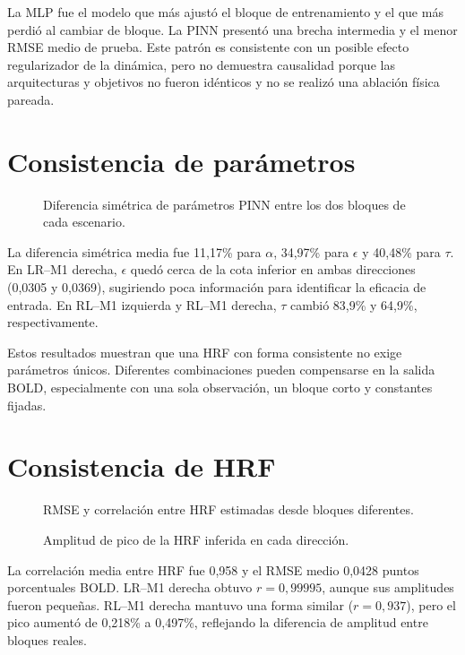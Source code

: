 La MLP fue el modelo que más ajustó el bloque de entrenamiento y el que más perdió al cambiar de bloque. La PINN presentó una brecha intermedia y el menor RMSE medio de prueba. Este patrón es consistente con un posible efecto regularizador de la dinámica, pero no demuestra causalidad porque las arquitecturas y objetivos no fueron idénticos y no se realizó una ablación física pareada.

\section{Consistencia de parámetros}
\begin{figure}[H]
\centering
{}
\caption{Diferencia simétrica de parámetros PINN entre los dos bloques de cada escenario.}
\label{fig:real_param_consistency}
\end{figure}

La diferencia simétrica media fue 11,17\% para $\alpha$, 34,97\% para $\epsilon$ y 40,48\% para $\tau$. En LR--M1 derecha, $\epsilon$ quedó cerca de la cota inferior en ambas direcciones (0,0305 y 0,0369), sugiriendo poca información para identificar la eficacia de entrada. En RL--M1 izquierda y RL--M1 derecha, $\tau$ cambió 83,9\% y 64,9\%, respectivamente.

Estos resultados muestran que una HRF con forma consistente no exige parámetros únicos. Diferentes combinaciones pueden compensarse en la salida BOLD, especialmente con una sola observación, un bloque corto y constantes fijadas.

\section{Consistencia de HRF}
\begin{figure}[H]
\centering
{}
\caption{RMSE y correlación entre HRF estimadas desde bloques diferentes.}
\label{fig:real_hrf_consistency}
\end{figure}

\begin{figure}[H]
\centering
{}
\caption{Amplitud de pico de la HRF inferida en cada dirección.}
\label{fig:real_hrf_peak}
\end{figure}

La correlación media entre HRF fue 0,958 y el RMSE medio 0,0428 puntos porcentuales BOLD. LR--M1 derecha obtuvo $r=0,99995$, aunque sus amplitudes fueron pequeñas. RL--M1 derecha mantuvo una forma similar ($r=0,937$), pero el pico aumentó de 0,218\% a 0,497\%, reflejando la diferencia de amplitud entre bloques reales.

